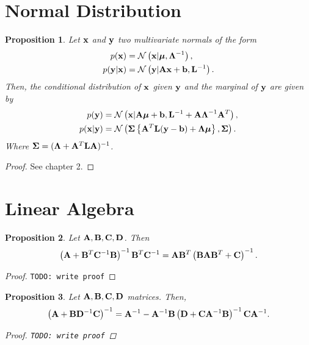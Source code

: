 \documentclass[11pt]{article}
\numberwithin{equation}{section}
\newcommand{\x}{{\bf x}}
\newcommand{\N}{\mathcal{N}}
\newtheorem{proposition}{Proposition}[section]
\begin{document}
\appendix
\section{Normal Distribution}
\begin{proposition} \label{prop:multivariate-normal-combination}
	Let $\x$ and ${\bf y}$ two multivariate normals of the form
	\begin{align}
		p(\x) &= \N\left(\x \vert \boldsymbol\mu, \boldsymbol\Lambda^{-1}\right),\\
		p({\bf y} \vert \x ) &= \N\left({\bf y} \vert {\bf A}\x + {\bf b}, {\bf L}^{-1}\right).
	\end{align}
	Then, the conditional distribution of $\x$ given ${\bf y}$ and the marginal of ${\bf y}$ are given by
	\begin{align}
		p({\bf y}) &= \N\left(\x\vert {\bf A}\boldsymbol\mu + {\bf b}, {\bf L}^{-1} + {\bf A}\boldsymbol\Lambda^{-1}{\bf A}^T\right), \label{eq:normal-marginal}\\
		p(\x \vert {\bf y}) &= \N\left(\boldsymbol\Sigma\left\{{\bf A}^T {\bf L}({\bf y} - {\bf b})  + \boldsymbol\Lambda\boldsymbol\mu \right\}, \boldsymbol\Sigma\right) \label{eq:normal-conditional}.
	\end{align}
	Where $\boldsymbol{\Sigma} = (\boldsymbol\Lambda + {\bf A}^T {\bf L} {\bf A})^{-1}$.
\end{proposition}

\begin{proof}
	See \cite{prml} chapter 2.
\end{proof}

\section{Linear Algebra}

\begin{proposition} \label{prop:matrix-rewrite1}
	Let ${\bf A}, {\bf B}, {\bf C}, {\bf D}$. Then
	\begin{equation}
		\left({\bf A} + {\bf B}^T {\bf C}^{-1} {\bf B}\right)^{-1}{\bf B}^T {\bf C}^{-1} = {\bf A}{\bf B}^T\left({\bf B}{\bf A}{\bf B}^T + {\bf C}\right)^{-1}.
	\end{equation}
\end{proposition}

\begin{proof}
	\texttt{TODO: write proof}
\end{proof}

\begin{proposition} \label{prop:woodbury-identity}
	Let ${\bf A}, {\bf B}, {\bf C}, {\bf D}$ matrices. Then,
	\begin{equation}
		\left({\bf A} + {\bf B} {\bf D}^{-1}{\bf C}\right)^{-1} = {\bf A}^{-1} - {\bf A}^{-1}{\bf B}\left({\bf D} + {\bf C}{\bf A}^{-1}{\bf B}\right)^{-1}{\bf C}{\bf A}^{-1}.
	\end{equation}
	\begin{proof}
		\texttt{TODO: write proof}
	\end{proof}
\end{proposition}


\end{document}
